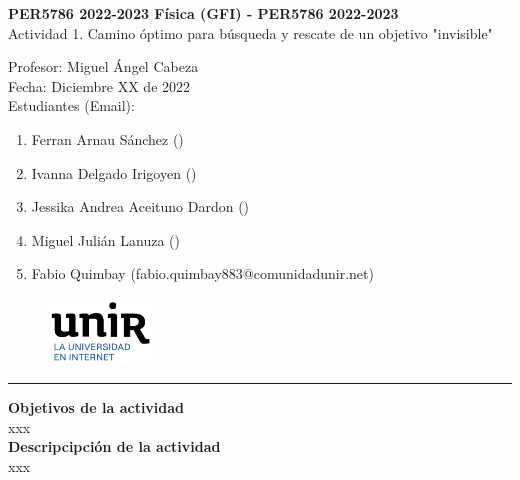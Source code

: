\documentclass[11pt,letterpaper]{article}
\begin{document}
\pagestyle{plain}

\begin{center}\vspace{0cm}
\textbf{\large PER5786 2022-2023  Física (GFI) - PER5786 2022-2023}\\
Actividad 1. Camino óptimo para búsqueda y rescate de un objetivo "invisible"
\end{center}

\begin{flushleft}
	Profesor: Miguel Ángel Cabeza\\
	Fecha: Diciembre XX de 2022\\
	Estudiantes (Email): \\
	\begin{enumerate}
		\item Ferran Arnau Sánchez ()
		\item Ivanna Delgado Irigoyen ()
		\item Jessika Andrea Aceituno Dardon ()
		\item Miguel Julián Lanuza ()
		\item Fabio Quimbay (fabio.quimbay883@comunidadunir.net)
	\end{enumerate}
\end{flushleft}

\begin{figure}
    \centering
    \includegraphics[width=0.25\textwidth]{logo.png}
\end{figure}

 
\rule{\linewidth}{0.1mm}

\bigskip
\bigskip

\textbf{Objetivos de la actividad}\\

xxx\\

\textbf{Descripcipción de la actividad}\\

xxx

\end{document}
